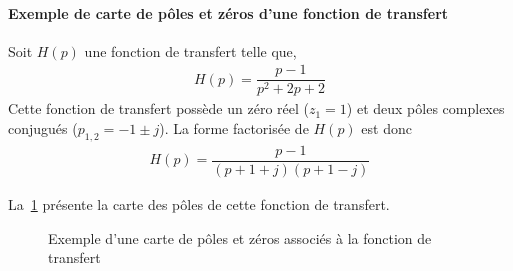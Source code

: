 \paragraph{Exemple de carte de pôles et zéros d'une fonction de transfert}

Soit $H(p)$ une fonction de transfert telle que,
\begin{align}
H(p)=\dfrac{p-1}{p^2+2p+2}\label{eq-ft_carte}
\end{align}
Cette fonction de transfert possède un zéro réel ($z_1=1$) et deux 
pôles complexes conjugués ($p_{1,2}=-1\pm j$).
La forme factorisée de $H(p)$ est donc
\begin{align} 
    H(p)=\dfrac{p-1}{(p+1+j)(p+1-j)}
\end{align}

La~\cref{fig-carte} présente la carte des pôles de cette fonction de transfert.
\begin{figure}[!h]
    \begin{center}
    
\end{center}
\caption{Exemple d'une carte de pôles et zéros associés 
    à la fonction de transfert~\label{fig-carte} }
\end{figure}



